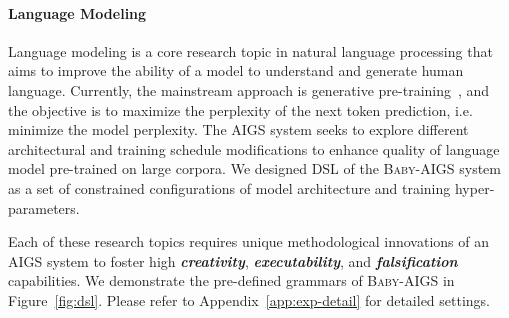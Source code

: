 \documentclass{article} %
\newcommand{\AIGS}{AIGS\xspace}
\newcommand{\AIGSSys}{\textsc{Baby-AIGS}\xspace}
\newcommand{\DSL}{\textsc{DSL}\xspace}
\begin{document}
\paragraph{Language Modeling} 
Language modeling is a core research topic in natural language processing that aims to improve the ability of a model to understand and generate human language. Currently, the mainstream approach is generative pre-training~\citep{radford2018improving}, and the objective is to maximize the perplexity of the next token prediction, i.e. minimize the model perplexity. The \AIGS system seeks to explore different architectural and training schedule modifications to enhance quality of language model pre-trained on large corpora. We designed \DSL of the \AIGSSys system as a set of constrained configurations of model architecture and training hyper-parameters. 

Each of these research topics requires unique methodological innovations of an \AIGS system to foster high \textbf{\textit{creativity}}, \textbf{\textit{executability}}, and \textbf{\textit{falsification}} capabilities. We demonstrate the pre-defined grammars of \AIGSSys in Figure~\ref{fig:dsl}. Please refer to Appendix~\ref{app:exp-detail} for detailed settings. 
\end{document}
